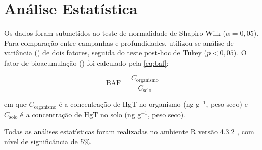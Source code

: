 \section{Análise Estatística}

Os dados foram submetidos ao teste de normalidade de Shapiro-Wilk
($\alpha = 0{,}05$). Para comparação entre campanhas e profundidades,
utilizou-se análise de variância () de dois fatores, seguida do teste post-hoc de Tukey
($p < 0{,}05$). O fator de bioacumulação () foi calculado pela \autoref{eq:baf}:

\begin{equation}
  \label{eq:baf}
  \mathrm{BAF} = \frac{C_{\text{organismo}}}{C_{\text{solo}}}
\end{equation}

\noindent em que $C_{\text{organismo}}$ é a concentração de HgT no
organismo (ng g$^{-1}$, peso seco) e $C_{\text{solo}}$ é a
concentração de HgT no solo (ng g$^{-1}$, peso seco).

Todas as análises estatísticas foram realizadas no ambiente R versão
4.3.2 \cite{exemplo:web:2024}, com nível de significância de 5\%.

